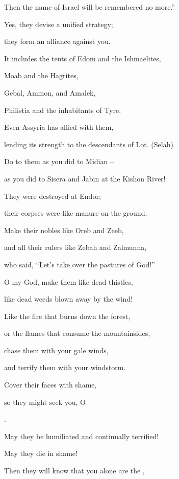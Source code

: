 {\par }{\Q Then the name
of Israel
will be remembered
no
more.”
\par }{\Q {}Yes,
they devise
a unified
strategy;
\par }{\Q they form
an alliance
against you.
\par }{\Q {}It includes the tents
of Edom
and the Ishmaelites,
\par }{\Q Moab
and the Hagrites,
\par }{\Q {}Gebal,
Ammon,
and Amalek,
\par }{\Q Philistia
and the inhabitants
of Tyre.
\par }{\Q {}Even
Assyria
has allied
with
them,
\par }{\Q lending its strength
to the descendants
of Lot.
(Selah)
\par }{\Q {}Do
to them
as you did to Midian –
\par }{\Q as you did to Sisera
and Jabin
at the Kishon
River!
\par }{\Q {}They were destroyed
at Endor;
\par }{\Q their corpses were like manure
on the ground.
\par }{\Q {}Make
their nobles
like Oreb
and Zeeb,
\par }{\Q and all
their rulers
like Zebah
and Zalmunna,
\par }{\Q {}who
said, “Let’s take
over the pastures
of God!”
\par }{\Q {}O my God,
make
them like dead thistles,
\par }{\Q like dead weeds blown
away by the wind!
\par }{\Q {}Like the fire
that burns down
the forest,
\par }{\Q or the flames
that consume
the mountainsides,
\par }{\Q {}chase
them with your gale winds,
\par }{\Q and terrify
them with your windstorm.
\par }{\Q {}Cover
their faces
with shame,
\par }{\Q so they might
seek
you, O

{}.
\par }{\Q {}May they be humiliated
and continually
terrified!

\par }{\Q May they die
in shame!
\par }{\Q {}Then they will know
that
you
alone
are the
{},

}
